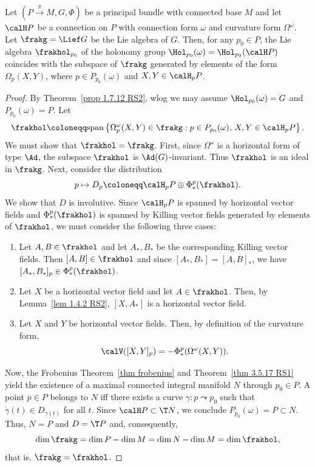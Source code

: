 \begin{thm}\label{thm 1.7.15 RS2 Ambrose-Singer}
    Let $(P\overset{\pi}{\to}M,G,\Phi)$ be a principal bundle with connected base $M$ and let $\calH P$ be a connection on $P$ with connection form $\omega$ and curvature form $\Omega^\omega$. Let $\frakg=\Lief G$ be the Lie algebra of $G$. Then, for any $p_0\in P$, the Lie algebra $\frakhol_{p_0}$ of the holonomy group $\Hol_{p_0}(\omega)=\Hol_{p_0}(\calH P)$ coincides with the subspace of $\frakg$ generated by elements of the form $\Omega_p(X,Y)$, where $p\in P_{p_0}(\omega)$ and $X,Y\in\calH_p P$.
\end{thm}
\begin{proof}
    By Theorem~\ref{prop 1.7.12 RS2}, \gls{wlog} we may assume $\Hol_{p_0}(\omega)=G$ and $P_{p_0}(\omega)=P$. Let
    \[\frakhol\coloneqq \mathrm{span}\left\{\Omega^\omega_p(X,Y)\in\frakg : p\in P_{p_0}(\omega),\, X,Y\in\calH_p P\right\}.\]
    We must show that $\frakhol=\frakg$. First, since $\Omega^\omega$ is a horizontal form of type $\Ad$, the subspace $\frakhol$ is $\Ad(G)$-invariant. Thus $\frakhol$ is an ideal in $\frakg$. Next, consider the distribution
    \[p\mapsto D_p\coloneqq \calH_pP \oplus \Phi^p_\ast(\frakhol).\]
    We show that $D$ is involutive. Since $\calH_p P$ is spanned by horizontal vector fields and $\Phi^p_\ast(\frakhol)$ is spanned by Killing vector fields generated by elements of $\frakhol$, we must consider the following three cases:
    \begin{enumerate}[label=(\alph*)]
        \item Let $A,B\in\frakhol$ and let  $A_\ast,B_\ast$ be the corresponding Killing vector fields. Then $[A,B]\in\frakhol$ and since $[A_\ast,B_\ast]=[A,B]_\ast$, we have $[A_\ast,B_\ast]_p\in \Phi^p_\ast(\frakhol)$.
        \item Let $X$ be a horizontal vector field and let $A\in\frakhol$. Then, by Lemma~\ref{lem 1.4.2 RS2}, $[X,A_\ast]$ is a horizontal vector field.
        \item Let $X$ and $Y$ be horizontal vector fields. Then, by definition of the curvature form,
        \[\calV([X,Y]_p)=-\Phi^p_\ast(\Omega^\omega(X,Y)).\]
    \end{enumerate}
    Now, the Frobenius Theorem~\ref{thm frobenius} and Theorem~\ref{thm 3.5.17 RS1} yield the existence of a maximal connected integral manifold $N$ through $p_0\in P$. A point $p\in P$ belongs to $N$ iff there exists a curve $\gamma:p\leadsto p_0$ such that $\dot\gamma(t)\in D_{\gamma(t)}$ for all $t$. Since $\calH P\subset \T N$, we conclude $P_{p_0}(\omega)=P\subset N$. Thus, $N=P$ and $D=\T P$ and, consequently,
    \[\dim\frakg=\dim P-\dim M=\dim N-\dim M=\dim\frakhol,\]
    that is, $\frakg=\frakhol$.
\end{proof}

